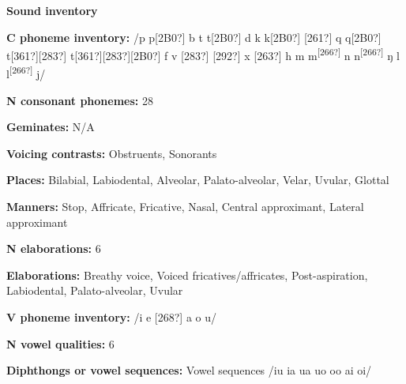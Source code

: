 \begin{styleBody}
\textbf{Sound inventory}
\end{styleBody}

\begin{styleBody}
\textbf{C phoneme inventory:} /p p[2B0?] b t t[2B0?] d k k[2B0?] [261?] q q[2B0?] t[361?][283?] t[361?][283?][2B0?] f v [283?] [292?] x [263?] h m m\textsuperscript{[266?]} n n\textsuperscript{[266?]} ŋ l l\textsuperscript{[266?]} j/
\end{styleBody}

\begin{styleBody}
\textbf{N consonant phonemes:} 28
\end{styleBody}

\begin{styleBody}
\textbf{Geminates:} N/A
\end{styleBody}

\begin{styleBody}
\textbf{Voicing contrasts: }Obstruents, Sonorants
\end{styleBody}

\begin{styleBody}
\textbf{Places: }Bilabial, Labiodental, Alveolar, Palato-alveolar, Velar, Uvular, Glottal
\end{styleBody}

\begin{styleBody}
\textbf{Manners:} Stop, Affricate, Fricative, Nasal, Central approximant, Lateral approximant
\end{styleBody}

\begin{styleBody}
\textbf{N elaborations:} 6
\end{styleBody}

\begin{styleBody}
\textbf{Elaborations:} Breathy voice, Voiced fricatives/affricates, Post-aspiration, Labiodental, Palato-alveolar, Uvular
\end{styleBody}

\begin{styleBody}
\textbf{V phoneme inventory:} /i e [268?] a o u/
\end{styleBody}

\begin{styleBody}
\textbf{N vowel qualities:} 6
\end{styleBody}

\begin{styleBody}
\textbf{Diphthongs or vowel sequences:} Vowel sequences /iu ia ua uo oo ai oi/
\end{styleBody}

